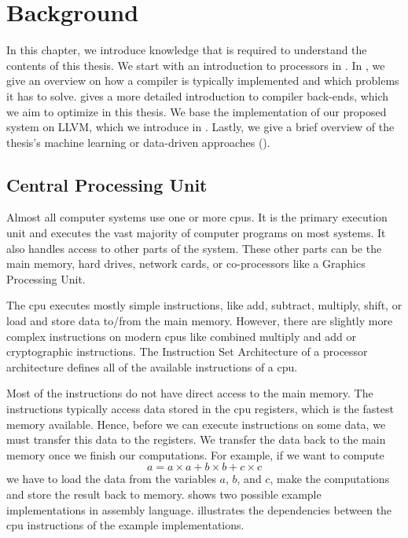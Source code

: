 \chapter{Background}
\label{sec:bg}
In this chapter, we introduce knowledge that is required to understand the contents of this thesis.
We start with an introduction to processors in .
In , we give an overview on how a compiler is typically implemented and which problems it has to solve.
 gives a more detailed introduction to compiler back-ends, which we aim to optimize in this thesis.
We base the implementation of our proposed system on LLVM, which we introduce in .
Lastly, we give a brief overview of the thesis's machine learning or data-driven approaches ().


% 

\section{Central Processing Unit}
\label{sec:bg:cpu}
Almost all computer systems use one or more \acp{cpu}.
It is the primary execution unit and executes the vast majority of computer programs on most systems.
It also handles access to other parts of the system.
These other parts can be the main memory, hard drives, network cards, or co-processors like a Graphics Processing Unit.

The \ac{cpu} executes mostly simple instructions, like add, subtract, multiply, shift, or load and store data to/from the main memory.
However, there are slightly more complex instructions on modern \acp{cpu} like combined multiply and add or cryptographic instructions.
The Instruction Set Architecture of a processor architecture defines all of the available instructions of a \ac{cpu}.

Most of the instructions do not have direct access to the main memory.
The instructions typically access data stored in the \ac{cpu} registers, which is the fastest memory available.
Hence, before we can execute instructions on some data, we must transfer this data to the registers.
We transfer the data back to the main memory once we finish our computations.
For example, if we want to compute 
\begin{equation}
    a=a\times a+b\times b+c\times c
    \label{eqn:bg:abc}
\end{equation}
we have to load the data from the variables $a$, $b$, and $c$, make the computations and store the result back to memory.
 shows two possible example implementations in assembly language.
 illustrates the dependencies between the \ac{cpu} instructions of the example implementations.

